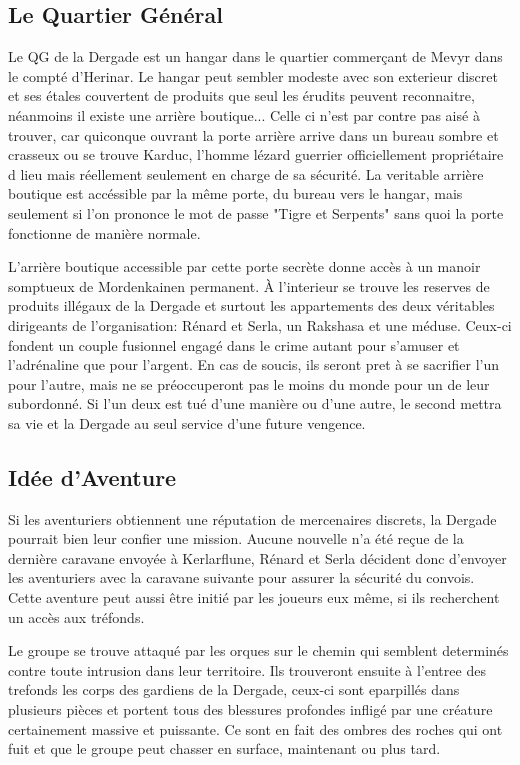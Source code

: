 \subsection*{Le Quartier Général}

Le QG de la Dergade est un hangar dans le quartier commerçant de Mevyr dans
le compté d'Herinar. Le hangar peut sembler modeste avec son exterieur 
discret et ses étales couvertent de produits que seul les érudits peuvent
reconnaitre, néanmoins il existe une arrière boutique... Celle ci n'est
par contre pas aisé à trouver, car quiconque ouvrant la porte arrière arrive
dans un bureau sombre et crasseux ou se trouve Karduc, l'homme lézard guerrier
officiellement propriétaire d lieu mais réellement seulement en charge de sa 
sécurité. La veritable arrière boutique est accéssible par la même porte,
du bureau vers le hangar, mais seulement si l'on prononce le mot de passe
"Tigre et Serpents" sans quoi la porte fonctionne de manière normale.  

L'arrière boutique accessible par cette porte secrète donne accès à un manoir
somptueux de Mordenkainen permanent. À l'interieur se trouve les reserves
de produits illégaux de la Dergade et surtout les appartements des deux
véritables dirigeants de l'organisation: Rénard et Serla, un Rakshasa et une
méduse. Ceux-ci fondent un couple fusionnel engagé dans le crime autant pour
s'amuser et l'adrénaline que pour l'argent. En cas de soucis, ils seront pret
à se sacrifier l'un pour l'autre, mais ne se préoccuperont pas le moins du 
monde pour un de leur subordonné. Si l'un deux est tué d'une manière ou 
d'une autre, le second mettra sa vie et la Dergade au seul service d'une 
future vengence. 


\subsection*{Idée d'Aventure}

Si les aventuriers obtiennent une réputation de mercenaires discrets, la
Dergade pourrait bien leur confier une mission. Aucune nouvelle n'a été
reçue de la dernière caravane envoyée à Kerlarflune, Rénard et Serla 
décident donc d'envoyer les aventuriers avec la caravane suivante pour 
assurer la sécurité du convois. Cette aventure peut aussi être initié 
par les joueurs eux même, si ils recherchent un accès aux tréfonds.

Le groupe se trouve attaqué par les orques sur le chemin qui semblent 
determinés contre toute intrusion dans leur 
territoire. Ils trouveront ensuite à l'entree des trefonds les corps des 
gardiens de la Dergade, ceux-ci sont eparpillés dans plusieurs pièces et 
portent tous des blessures profondes infligé par une créature certainement 
massive et puissante. Ce sont en fait des ombres des roches qui ont fuit
et que le groupe peut chasser en surface, maintenant ou plus tard. 

